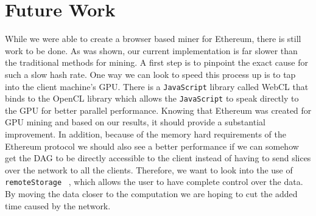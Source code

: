 \documentclass[10pt, conference, compsocconf]{IEEEtran}
\begin{document}


\section{Future Work}

While we were able to create a browser based miner for Ethereum, there is still work to be done. As was shown, our current implementation is far slower than the traditional methods for mining. A first step is to pinpoint the exact cause for such a slow hash rate. One way we can look to speed this process up is to tap into the client machine's GPU. There is a \verb|JavaScript| library called WebCL that binds to the OpenCL library which allows the \verb|JavaScript| to speak directly to the GPU for better parallel performance. Knowing that Ethereum was created for GPU mining and based on our results, it should provide a substantial improvement. In addition, because of the memory hard requirements of the Ethereum protocol we should also see a better performance if we can somehow get the DAG to be directly accessible to the client instead of having to send slices over the network to all the clients. Therefore, we want to look into the use of \verb|remoteStorage| ~\cite{remote}, which allows the user to have complete control over the data. By moving the data closer to the computation we are hoping to cut the added time caused by the network.
\end{document}
